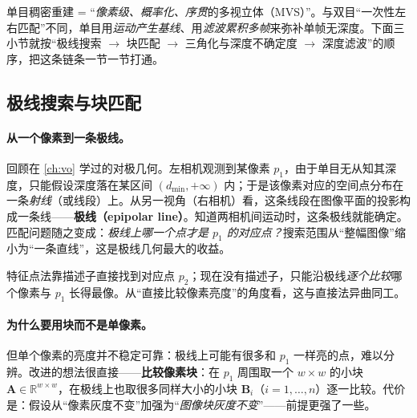 \begin{insight}
单目稠密重建 = “\emph{像素级、概率化、序贯}的多视立体（MVS）”。与双目“一次性左右匹配”不同，单目用\emph{运动产生基线}、用\emph{滤波累积多帧}来弥补单帧无深度。下面三小节就按“极线搜索 $\to$ 块匹配 $\to$ 三角化与深度不确定度 $\to$ 深度滤波”的顺序，把这条链条一节一节打通。
\end{insight}

\subsection{极线搜索与块匹配}
\label{sec:dense-epipolar}

\paragraph{从一个像素到一条极线。}
回顾在 \cref{ch:vo} 学过的对极几何。左相机观测到某像素 $p_1$，由于单目无从知其深度，只能假设深度落在某区间 $(d_{\min},+\infty)$ 内；于是该像素对应的空间点分布在一条\emph{射线}（或线段）上。从另一视角（右相机）看，这条线段在图像平面的投影构成一条线——\textbf{极线（epipolar line）}。知道两相机间运动时，这条极线就能确定。匹配问题随之变成：\emph{极线上哪一个点才是 $p_1$ 的对应点？}搜索范围从“整幅图像”缩小为“一条直线”，这是极线几何最大的收益。

特征点法靠描述子直接找到对应点 $p_2$；现在没有描述子，只能沿极线\emph{逐个比较}哪个像素与 $p_1$ 长得最像。从“直接比较像素亮度”的角度看，这与直接法异曲同工。

\paragraph{为什么要用块而不是单像素。}
但单个像素的亮度并不稳定可靠：极线上可能有很多和 $p_1$ 一样亮的点，难以分辨。改进的想法很直接——\textbf{比较像素块}：在 $p_1$ 周围取一个 $w\times w$ 的小块 $\mathbf{A}\in\mathbb{R}^{w\times w}$，在极线上也取很多同样大小的小块 $\mathbf{B}_i$（$i=1,\dots,n$）逐一比较。代价是：假设从“像素灰度不变”加强为“\emph{图像块灰度不变}”——前提更强了一些。

